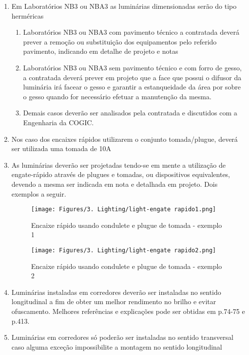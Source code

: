 \begin{enumerate}
		\item Em Laboratórios NB3 ou NBA3 as luminárias dimensionadas serão do tipo herméricas
		\begin{enumerate}
			\item Laboratórios NB3 ou NBA3 com pavimento técnico a contratada deverá prever a remoção ou substituição dos equipamentos pelo referido pavimento, indicando em detalhe de projeto e notas
			\item Laboratórios NB3 ou NBA3 sem pavimento técnico e com forro de gesso, a contratada deverá prever em projeto que a face que possui o difusor da luminária irá facear o gesso e garantir a estanqueidade da área por sobre o gesso quando for necessário efetuar a manutenção da mesma.
			\item Demais casos deverão ser analisados pela contratada e discutidos com a Engenharia da COGIC.
		\end{enumerate}

		\item\label{light:encaixe10A}Nos caso dos encaixes rápidos utilizarem o conjunto tomada/plugue, deverá ser utilizada uma tomada de 10A
		
		\item As luminárias deverão ser projetadas tendo-se em mente a utilização de engate-rápido através de plugues e tomadas, ou dispositivos equivalentes, devendo a mesma ser indicada em nota e detalhada em projeto. Dois exemplos a seguir.
		
		\begin{figure}[H]
			\centering
			\texttt{[image: Figures/3. Lighting/light-engate rapido1.png]}
			\hfill
			\caption{Encaixe rápido usando condulete e plugue de tomada - exemplo 1}
			\label{fig: engate-rapido1}
		\end{figure}
		\begin{figure}[H]
			\centering
			\texttt{[image: Figures/3. Lighting/light-engate rapido2.png]}
			\hfill
			\caption{Encaixe rápido usando condulete e plugue de tomada - exemplo 2}
			\label{fig: engate-rapido2}
		\end{figure}


		\item Luminárias instaladas em corredores deverão ser instaladas no sentido longitudinal a fim de obter um melhor rendimento no brilho e evitar ofuscamento. Melhores referências e explicações pode ser obtidas em \cite{simons2008lighting} p.74-75 e \cite{van2019interior} p.413.
		
		\item Luminárias em corredores só poderão ser instaladas no sentido transversal caso alguma exceção impossibilite a montagem no sentido longitudinal
	
	\end{enumerate}